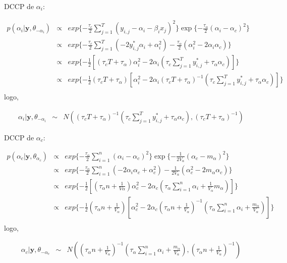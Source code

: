\documentclass[12pt,a4paper,header]{abnt}
\def\bs{\boldsymbol}
\begin{document}
\ac{DCCP} de $\alpha_i$:

\begin{eqnarray}
p(\alpha_i | \bs{y}, \theta_{-\alpha_i}) &\propto& exp\{ -\frac{\tau_c}{2} \sum^T_{j=1} (y_{i,j} -\alpha_i-  \beta_ix_j)^2  \} \exp\{ - \frac{\tau_\alpha}{2} (\alpha_i-\alpha_c)^2 \}
\\
%
&\propto& exp\{ -\frac{\tau_c}{2} \sum^T_{j=1} (-2y^*_{i,j}\alpha_i + \alpha_i^2) - \frac{\tau_\alpha}{2} (\alpha_i^2-2\alpha_i\alpha_c) \} \\
%
&\propto& exp\{ -\frac{1}{2} [ (\tau_c T +\tau_\alpha)\alpha_i^2 - 2\alpha_i (\tau_c \sum^T_{j=1} y^*_{i,j} +\tau_\alpha \alpha_c  ) ]  \} \\
%
&\propto& exp\{ -\frac{1}{2} (\tau_c T +\tau_\alpha) [ \alpha_i^2 - 2\alpha_i(\tau_c T +\tau_\alpha)^{-1}(\tau_c \sum^T_{j=1} y^*_{i,j} +\tau_\alpha \alpha_c  ) ]  \} \\
\end{eqnarray}
logo,

\begin{eqnarray}
\alpha_i | \bs{y}, \theta_{-\alpha_i}  &\sim& N( (\tau_c T +\tau_\alpha)^{-1}(\tau_c \sum^T_{j=1} y^*_{i,j} +\tau_\alpha \alpha_c  ) , (\tau_c T +\tau_\alpha)^{-1}   )
\end{eqnarray}

\ac{DCCP} de $\alpha_c$:

\begin{eqnarray}
p(\alpha_c | \bs{y}, \theta_{\alpha_c}) &\propto& exp\{ -\frac{\tau_\alpha}{2} \sum^n_{i=1} (\alpha_i -\alpha_c)^2  \} \exp\{ - \frac{1}{2V_\alpha} (\alpha_c-m_\alpha)^2 \}
\\
%
&\propto& exp\{ -\frac{\tau_\alpha}{2} \sum^n_{i=1} (-2\alpha_i\alpha_c + \alpha_c^2) - \frac{1}{2V_\alpha} (\alpha_c^2-2m_\alpha\alpha_c) \} \\
%
&\propto& exp\{ -\frac{1}{2} [ (\tau_\alpha n +\frac{1}{V\alpha})\alpha_c^2 - 2\alpha_c (\tau_\alpha \sum^n_{i=1}  \alpha_i+\frac{1}{V_\alpha}m_\alpha) ]  \} \\
%
&\propto& exp\{ -\frac{1}{2} (\tau_\alpha n +\frac{1}{V_\alpha}) [ \alpha_c^2 - 2\alpha_c(\tau_\alpha n +\frac{1}{V_\alpha})^{-1}(\tau_\alpha \sum^n_{i=1} \alpha_i + \frac{m_\alpha}{V_\alpha} ) ]  \} \\
\end{eqnarray}
logo,

\begin{eqnarray}
\alpha_c | \bs{y}, \theta_{-\alpha_c}  &\sim& N( (\tau_\alpha n +\frac{1}{V_\alpha})^{-1}(\tau_\alpha \sum^n_{i=1} \alpha_i + \frac{m_\alpha}{V_\alpha} ),(\tau_\alpha n +\frac{1}{V_\alpha})^{-1}  )
\end{eqnarray}
\end{document}
